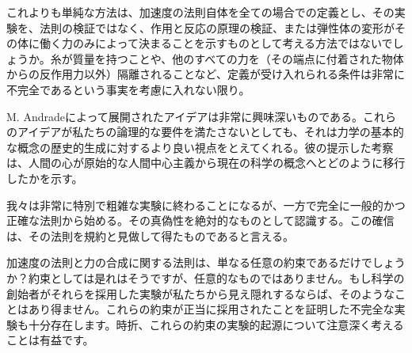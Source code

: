 \documentclass[a4paper,11pt,openany]{ltjsbook}
\begin{document}
これよりも単純な方法は、加速度の法則自体を全ての場合での定義とし、その実験を、法則の検証ではなく、作用と反応の原理の検証、または弾性体の変形がその体に働く力のみによって決まることを示すものとして考える方法ではないでしょうか。糸が質量を持つことや、他のすべての力を（その端点に付着された物体からの反作用力以外）隔離されることなど、定義が受け入れられる条件は非常に不完全であるという事実を考慮に入れない限り。

M. Andradeによって展開されたアイデアは非常に興味深いものである。これらのアイデアが私たちの論理的な要件を満たさないとしても、それは力学の基本的な概念の歴史的生成に対するより良い視点をとえてくれる。彼の提示した考察は、人間の心が原始的な人間中心主義から現在の科学の概念へとどのように移行したかを示す。

我々は非常に特別で粗雑な実験に終わることになるが、一方で完全に一般的かつ正確な法則から始める。その真偽性を絶対的なものとして認識する。この確信は、その法則を規約と見做して得たものであると言える。


加速度の法則と力の合成に関する法則は、単なる任意の約束であるだけでしょうか？約束としては是れはそうですが、任意的なものではありません。もし科学の創始者がそれらを採用した実験が私たちから見え隠れするならば、そのようなことはあり得ません。これらの約束が正当に採用されたことを証明した不完全な実験も十分存在します。時折、これらの約束の実験的起源について注意深く考えることは有益です。
\end{document}
